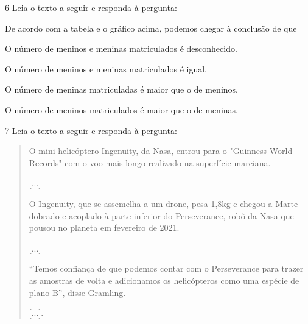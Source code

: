 \num{6} Leia o texto a seguir e responda à pergunta:


De acordo com a tabela e o gráfico acima, podemos chegar à conclusão de
que

\begin{escolha}
\item O número de meninos e meninas matriculados é desconhecido.

\item O número de meninos e meninas matriculados é igual.

\item O número de meninas matriculadas é maior que o de meninos.

\item O número de meninos matriculados é maior que o de meninas.
\end{escolha}


\num{7} Leia o texto a seguir e responda à pergunta:

\begin{quote}
O mini-helicóptero Ingenuity, da Nasa, entrou para o "Guinness World
Records" com o voo mais longo realizado na superfície marciana.

{[}...{]}

O Ingenuity, que se assemelha a um drone, pesa 1,8kg e chegou a Marte
dobrado e acoplado à parte inferior do Perseverance, robô da Nasa que
pousou no planeta em fevereiro de 2021.

{[}...{]}

``Temos confiança de que podemos contar com o Perseverance para trazer
as amostras de volta e adicionamos os helicópteros como uma espécie de
plano B'', disse Gramling.

{[}...{]}.

\end{quote}

